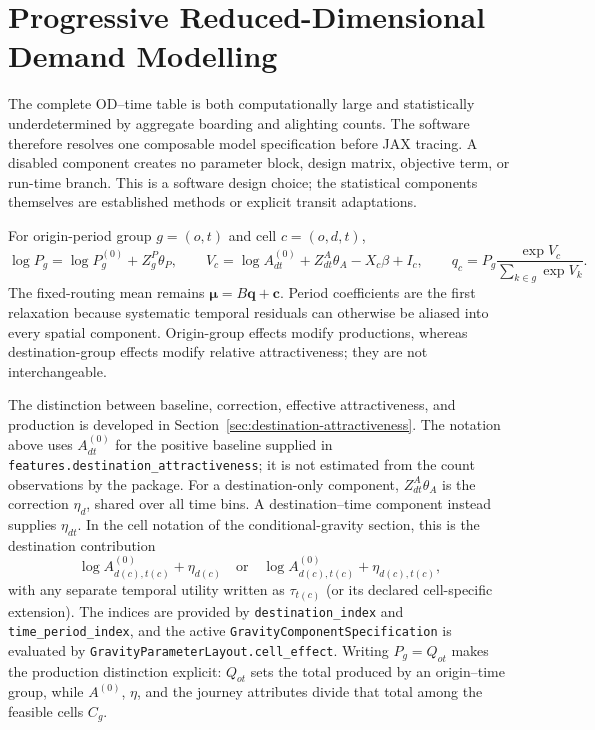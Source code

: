 \section{Progressive Reduced-Dimensional Demand Modelling}

The complete OD--time table is both computationally large and statistically
underdetermined by aggregate boarding and alighting counts.  The software
therefore resolves one composable model specification before JAX tracing.  A
disabled component creates no parameter block, design matrix, objective term,
or run-time branch.  This is a software design choice; the statistical
components themselves are established methods or explicit transit adaptations.

For origin-period group $g=(o,t)$ and cell $c=(o,d,t)$,
\[
 \log P_g=\log P_g^{(0)}+Z_g^{P}\theta_P,
 \qquad
 V_c=\log A_{dt}^{(0)}+Z_{dt}^{A}\theta_A-X_c\beta+I_c,
 \qquad
 q_c=P_g\frac{\exp V_c}{\sum_{k\in g}\exp V_k}.
\]
The fixed-routing mean remains $\boldsymbol\mu=B\boldsymbol q+\boldsymbol c$.
Period coefficients are the first relaxation because systematic temporal
residuals can otherwise be aliased into every spatial component.  Origin-group
effects modify productions, whereas destination-group effects modify relative
attractiveness; they are not interchangeable.

The distinction between baseline, correction, effective attractiveness, and
production is developed in Section~\ref{sec:destination-attractiveness}.  The
notation above uses $A^{(0)}_{dt}$ for the positive baseline supplied in
\texttt{features.destination\_attractiveness}; it is not estimated from the
count observations by the package.  For a destination-only component,
$Z^A_{dt}\theta_A$ is the correction $\eta_d$, shared over all time bins.  A
destination--time component instead supplies $\eta_{dt}$.  In the cell notation
of the conditional-gravity section, this is the destination contribution
\[
    \log A^{(0)}_{d(c),t(c)}+\eta_{d(c)}
    \quad\text{or}\quad
    \log A^{(0)}_{d(c),t(c)}+\eta_{d(c),t(c)},
\]
with any separate temporal utility written as $\tau_{t(c)}$ (or its declared
cell-specific extension).  The indices are provided by
\texttt{destination\_index} and \texttt{time\_period\_index}, and the active
\texttt{GravityComponentSpecification} is evaluated by
\texttt{GravityParameterLayout.cell\_effect}.  Writing $P_g=Q_{ot}$ makes the
production distinction explicit: $Q_{ot}$ sets the total produced by an
origin--time group, while $A^{(0)}$, $\eta$, and the journey attributes divide
that total among the feasible cells $C_g$.

